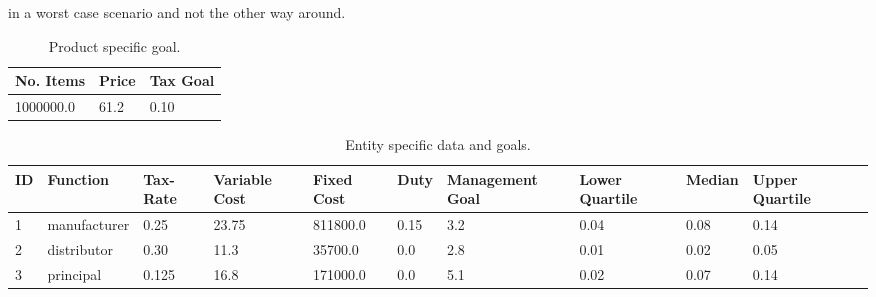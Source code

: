 \documentclass[conference,final,]{IEEEtran}
\begin{document}
in a worst case scenario and not the other way around.
\begin{table}[]
\centering
\caption{Product specific goal.}
\label{ps-goal}
\begin{tabular}{@{}lll@{}}
\toprule
No. Items    & Price & Tax Goal \\ \midrule
1000000.0 & 61.2  & 0.10    \\ \bottomrule
\end{tabular}
\end{table}
\begin{table}[]
\centering
\caption{Entity specific data and goals.}
\label{es-goal}
\begin{tabular}{@{}lllllllllll@{}}
\toprule
ID & Function & Tax-Rate   & Variable Cost & Fixed Cost    & Duty & Management Goal & Lower Quartile & Median & Upper Quartile \\ \midrule
1  & manufacturer & 0.25  & 23.75 & 811800.0 & 0.15   & 3.2   & 0.04      & 0.08   & 0.14      \\
2  & distributor  & 0.30  & 11.3  & 35700.0  & 0.0    & 2.8   & 0.01      & 0.02   & 0.05      \\
3  & principal    & 0.125 & 16.8  & 171000.0 & 0.0    & 5.1   & 0.02      & 0.07   & 0.14      \\ \bottomrule
\end{tabular}
\end{table}
\end{document}
